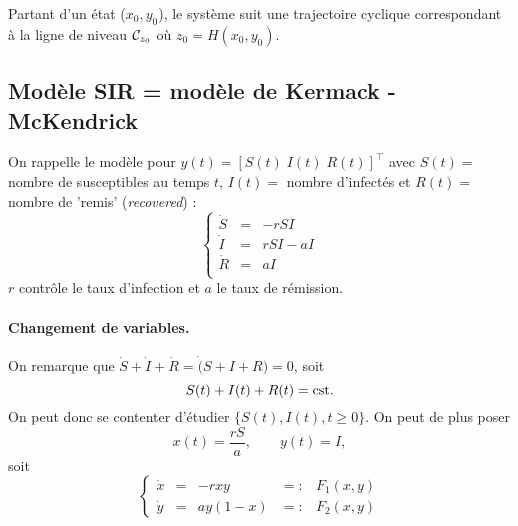 \bigskip
Partant d'un état ($x_0, y_0$), le système suit une trajectoire cyclique 
correspondant à la ligne de niveau $\mathcal{C}_{z_0}$ où $z_0 = H(x_0, y_0)$.


\subsection{Modèle SIR = modèle de Kermack - McKendrick}

On rappelle le modèle pour $y(t) = [S(t) \; I(t) \; R(t)]^\top$ avec $S(t) =$ nombre de susceptibles au temps $t$, $I(t) =$ nombre d'infectés et $R(t) =$ nombre de 'remis' ({\em recovered}) :
$$
\left\{ \begin{array}{rcl} 
\dot S & = & - r S I \\
\dot I & = & r S I - a I \\
\dot R & = & a I \\
\end{array} \right.
$$
$r$ contrôle le taux d'infection et $a$ le taux de rémission.

\paragraph*{Changement de variables.}
On remarque que $\dot S + \dot I + \dot R = \dot (S + I + R) = 0$, soit 
$$
S(t) + I(t) + R(t) = \text{cst}.
$$
On peut donc se contenter d'étudier $\{S(t), I(t), t \geq 0\}$. On peut de plus poser 
$$
x(t) = \frac{rS}a, \qquad y(t) = I,
$$
soit
$$
\left\{\begin{array}{rclcl}
        \dot x & = & -r x y & =: & F_1(x, y) \\
        \dot y & = & a y (1-x) & =: & F_2(x, y)
       \end{array}\right.
$$

